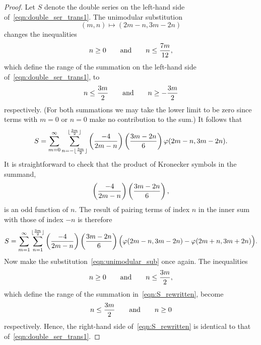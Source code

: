 \documentclass[10pt,a4paper]{amsart}
\begin{document}
\begin{proof}
Let $S$ denote the double series on the left-hand side of~\eqref{eqn:double_ser_trans1}. 
The unimodular substitution
\begin{equation} \label{eqn:unimodular_sub}
(m,n) \mapsto (2m-n, 3m-2n)
\end{equation}
changes the inequalities
\[ n \geq 0 \qquad \text{and} \qquad n \leq {7m \over 12}, \]
which define the range of the summation on the left-hand side of~\eqref{eqn:double_ser_trans1}, to
\[ n \leq {3m \over 2} \qquad \text{and} \qquad n \geq -{3m \over 2} \]
respectively. 
(For both summations we may take the lower limit to be zero since terms with $m=0$ or $n=0$ make no contribution to the sum.) 
It follows that
\[ S = \sum_{m=0}^\infty \sum_{n=-\lfloor {3m \over 2} \rfloor}^{\lfloor {3m \over 2} \rfloor} \left( {-4 \over 2m-n} \right) \left( {3m-2n \over 6} \right) \varphi(2m-n,3m-2n). \]
It is straightforward to check that the product of Kronecker symbols in the summand,
\[ \left( {-4 \over 2m-n} \right) \left( {3m-2n \over 6} \right), \]
is an odd function of $n$. 
The result of pairing terms of index $n$ in the inner sum with those of index $-n$ is therefore
\begin{equation} \label{eqn:S_rewritten}
S = \sum_{m=1}^\infty \sum_{n=1}^{\lfloor {3m \over 2} \rfloor} \left( {-4 \over 2m-n} \right) \left( {3m-2n \over 6} \right) \Big( \varphi(2m-n,3m-2n) - \varphi(2m+n,3m+2n) \Big).
\end{equation}
Now make the substitution~\eqref{eqn:unimodular_sub} once again. 
The inequalities
\[ n \geq 0 \qquad \text{and} \qquad n \leq {3m \over 2}, \]
which define the range of the summation in~\eqref{eqn:S_rewritten}, become
\[ n \leq {3m \over 2} \qquad \text{and} \qquad n \geq 0 \]
respectively. 
Hence, the right-hand side of~\eqref{eqn:S_rewritten} is identical to that of~\eqref{eqn:double_ser_trans1}.


\end{proof}
\end{document}
